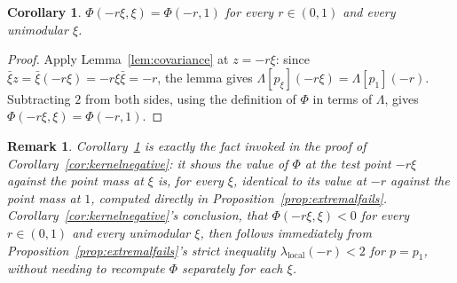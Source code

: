 \documentclass[pdflatex,sn-mathphys-num]{sn-jnl}%
\theoremstyle{thmstyleone}%
\theoremstyle{thmstyletwo}%
\newtheorem{remark}{Remark}%
\theoremstyle{thmstylethree}%
\newtheorem{corollary}{Corollary}
\begin{document}
\begin{appendices}
\begin{corollary}
\label{cor:covarianceapplied}
$\Phi(-r\xi,\xi)=\Phi(-r,1)$ for every $r\in(0,1)$ and every unimodular $\xi$.
\end{corollary}

\begin{proof}
Apply Lemma~\ref{lem:covariance} at $z=-r\xi$: since $\bar\xi z=\bar\xi(-r\xi)=-r\xi\bar\xi=-r$, the lemma gives $\Lambda[p_\xi](-r\xi)=\Lambda[p_1](-r)$. Subtracting $2$ from both sides, using the definition of $\Phi$ in terms of $\Lambda$, gives $\Phi(-r\xi,\xi)=\Phi(-r,1)$.
\end{proof}

\begin{remark}
Corollary~\ref{cor:covarianceapplied} is exactly the fact invoked in the proof of Corollary~\ref{cor:kernelnegative}: it shows the value of $\Phi$ at the test point $-r\xi$ against the point mass at $\xi$ is, for every $\xi$, identical to its value at $-r$ against the point mass at $1$, computed directly in Proposition~\ref{prop:extremalfails}. Corollary~\ref{cor:kernelnegative}'s conclusion, that $\Phi(-r\xi,\xi)<0$ for every $r\in(0,1)$ and every unimodular $\xi$, then follows immediately from Proposition~\ref{prop:extremalfails}'s strict inequality $\lambda_{\mathrm{local}}(-r)<2$ for $p=p_1$, without needing to recompute $\Phi$ separately for each $\xi$.
\end{remark}

\end{appendices}

\end{document}
